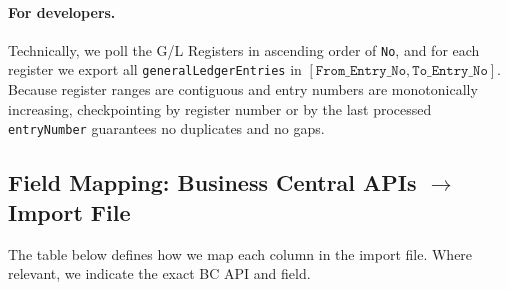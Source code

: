 \documentclass[a4paper,10pt]{article}
\begin{document}
\paragraph{For developers.}
Technically, we poll the G/L Registers in ascending order of \texttt{No}, and for each register we export all \texttt{generalLedgerEntries} in \([\texttt{From\_Entry\_No}, \texttt{To\_Entry\_No}]\). Because register ranges are contiguous and entry numbers are monotonically increasing, checkpointing by register number or by the last processed \texttt{entryNumber} guarantees no duplicates and no gaps.

\subsection{Field Mapping: Business Central APIs $\rightarrow$ Import File}

\noindent The table below defines how we map each column in the import file. Where relevant, we indicate the exact BC API and field.
\end{document}
